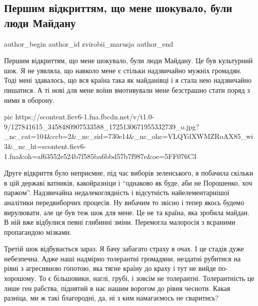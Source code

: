  
 
 
 
 
 
\subsection{Першим відкриттям, що мене шокувало, були люди Майдану}
\label{sec:26_11_2020.fb.zvirobii_marusja.1.ljudy_majdany}
\ifcmt
	author_begin
   author_id zvirobii_marusja
	author_end
\fi

Першим відкриттям, що мене шокувало, були люди Майдану. Це був культурний шок.
Я не уявляла, що навколо мене є стільки надзвичайно мужніх громадян. Тоді мені
здавалось, що вся країна така як майданівці і я стала нею надзвичайно пишатися.
А ті нові для мене воїни вмотивували мене безстрашно стати поряд з ними в
оборону.

\ifcmt
pic https://scontent.fiev6-1.fna.fbcdn.net/v/t1.0-9/127841615_3458480907533588_1725130671955332739_o.jpg?_nc_cat=104&ccb=2&_nc_sid=730e14&_nc_ohc=VLQYdXWMZRoAX85_wi3&_nc_ht=scontent.fiev6-1.fna&oh=af63552e524b7f585ba6bbd57b7f987e&oe=5FF076C3
\fi

Друге відкриття було неприємне, під час виборів зеленського, я побачила скільки
в цій державі ватників, какойразніци і \enquote{однаково як буде, аби не Порошенко, хоч
паржом}. Надзвичайна недалекоглядність і відсутність найелементарнішої
аналітики передвиборчих процесів. Ну вибачим то звісно і тепер якось будемо
вирулювати, але це був теж шок для мене. Це не та країна, яка зробила майдан. В
ній вже відбулися певні глибинні зміни. Перемогла малоросія з всраними
пропагандою мізками.

Третій шок відбувається зараз. Я бачу забагато страху в очах. І це стадія дуже
небезпечна. Адже наші надмірно толерантні громадяни, нездатні рубитися на рівні
з агресивною гопотою, яка тягне країну до краху і тут не вийде по-хорошому. То
є більшовики, наглі, грубі, і зовсім не толерантні. Толерантність це лише ген
рабства, піднятий в нас нашим ворогом до рівня чесноти. Какая разніца, ми ж
такі благородні, да, ні з ким намагаємось не сваритись? 

